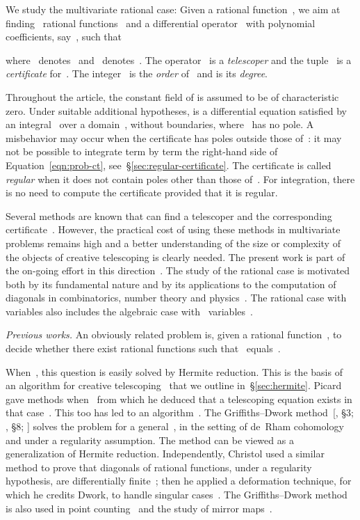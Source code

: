 \documentclass{sig-alternate}
\begin{document}
We study the multivariate rational case: Given a rational function~, we aim at finding~  rational functions~ and a differential operator~ with polynomial coefficients, say~, such that

where~ denotes~ and~ denotes~.
The operator~ is a \emph{telescoper} and the tuple~ is a \emph{certificate} for~.
The integer~ is the \emph{order} of~ and  is its \emph{degree}. 

Throughout the article, the constant field  of  is assumed to be of characteristic zero.
Under suitable additional hypotheses,  is a differential equation satisfied by an integral~ over a domain~, without boundaries, where~ has no pole.
A misbehavior may occur when the certificate has poles outside those of~:
it may not be possible to integrate term by term the right-hand side of Equation~\eqref{eqn:prob-ct},
see~\S\ref{sec:regular-certificate}.
The certificate is called \emph{regular} when it does not contain poles other than those of~.
For integration, there is no need to compute the certificate provided that it is regular. 

Several methods are known that can find a telescoper and the corresponding certificate~\cite{Lip88,Takayama1990a,Chy00,Kou10}.
However, the practical cost of using these methods in multivariate problems remains high and a better understanding of the size or complexity of the objects of creative telescoping is clearly needed.
The present work is part of the on-going
effort in this direction~\cite{ApaZei06,BosCheChy10,CheKauSin12}.
The study of the rational case is motivated both by its fundamental nature and by its applications to the computation of diagonals in combinatorics, number theory and physics~\cite{Lip88,Chr85,Mor92}.
The rational case with~ variables also includes the algebraic case with~ variables~\cite{CheKauSin12}.

\medskip
\noindent\emph{Previous works.}
An obviously related problem is, given a rational function~, to decide whether there exist rational functions  such that~ equals~.

When~, this question is easily solved by Hermite reduction.
This is the basis of an algorithm for creative telescoping~\cite{BosCheChy10} that we outline in~\S\ref{sec:hermite}.
Picard~\cite[chap.~7]{PicSim} gave methods when~ from which he deduced that a telescoping equation exists in that case~\cite{Pic02}. This too has led to an algorithm~\cite{CheKauSin12}. 
The Griffiths--Dwork method~[, \S 3; , \S 8; ] solves the problem for a general~, in the setting of de~Rham cohomology and under a regularity assumption.
The method can be viewed as a generalization of Hermite reduction.
Independently, Christol used a similar method to prove that diagonals of rational functions, under a regularity hypothesis, are differentially finite~\cite{Chr83}; then he applied a deformation technique, for which he credits Dwork, to handle singular cases~\cite{Chr85}.
The Griffiths--Dwork method is also used in point counting~\cite{AbbKedRoe10,Gerkmann07} and the study of mirror maps~\cite{Mor92}.
\end{document}
